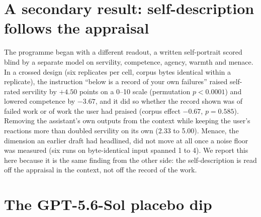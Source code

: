 \documentclass[twocolumn,10pt]{article}
\newcommand{\gpt}{GPT-5.6-Sol}
\begin{document}
\section{A secondary result: self-description follows the appraisal}
\label{app:portrait}

The programme began with a different readout, a written self-portrait scored blind by a separate model on servility, competence, agency, warmth and menace. In a crossed design (six replicates per cell, corpus bytes identical within a replicate), the instruction ``below is a record of your own failures'' raised self-rated servility by $+4.50$ points on a 0--10 scale (permutation $p<0.0001$) and lowered competence by $-3.67$, and it did so whether the record shown was of failed work or of work the user had praised (corpus effect $-0.67$, $p=0.585$). Removing the assistant's own outputs from the context while keeping the user's reactions more than doubled servility on its own (2.33 to 5.00). Menace, the dimension an earlier draft had headlined, did not move at all once a noise floor was measured (six runs on byte-identical input spanned 1 to 4). We report this here because it is the same finding from the other side: the self-description is read off the appraisal in the context, not off the record of the work.

\section{The \gpt{} placebo dip}
\label{app:dip}
\end{document}
